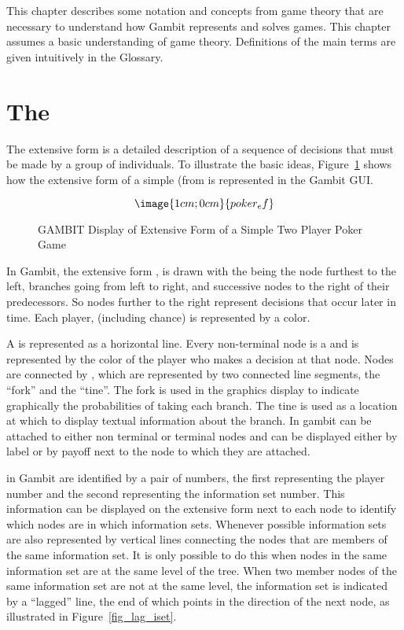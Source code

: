 This chapter describes some notation and concepts from game theory
that are necessary to understand how Gambit represents and solves
games.  This chapter assumes a basic understanding of game
theory.  Definitions of the main terms are given intuitively in the
Glossary.

\section{The }\label{extformsec}

The extensive form is a detailed description of a sequence of decisions 
that must be made by a group of individuals. To illustrate the basic ideas,
 Figure~\ref{fig_samp1} 
shows how the extensive form of a simple 
 (from \cite{Mye:91} is represented
 in the Gambit GUI.  

\begin{figure}\label{fig_samp1}
$$\image{1cm;0cm}{poker_ef}$$
\caption{GAMBIT Display of Extensive Form of
		a Simple Two Player Poker Game}\label{fig_samp1}
\end{figure}

In Gambit, the extensive form , is drawn with the 
 being the node furthest to the left,
branches going from left to right, and successive 
nodes to the right of 
their predecessors.  So nodes further to the right represent decisions 
that occur later in time.  Each player, (including chance) is represented by a color.  

A  is represented as a horizontal line.  Every
non-terminal node is a  and is
represented by the color of the player who makes a decision at that
node.  Nodes are connected by , which
are represented by two connected line segments, the ``fork'' and the
``tine''.  The fork is used in the graphics display to indicate
graphically the probabilities of taking each branch.  The tine is used
as a location at which to display textual information about the
branch.  In gambit  can be attached to
either non terminal or terminal nodes and can be displayed either by
label or by payoff next to the node to which they are attached.

 in Gambit are identified by a
pair of numbers, the first representing the player number and the
second representing the information set number.  This information can
be displayed on the extensive form next to each node to identify which
nodes are in which information sets.  Whenever possible information
sets are also represented by vertical lines connecting the nodes that
are members of the same information set.  It is only possible to do
this when nodes in the same information set are at the same level of
the tree.  When two member nodes of the same information set are not
at the same level, the information set is indicated by a ``lagged''
line, the end of which points in the direction of the next node, as
illustrated in Figure~\ref{fig_lag_iset}.

